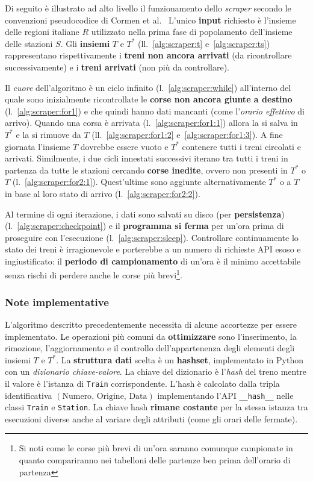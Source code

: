 \documentclass[12pt,italian]{report}
\begin{document}
Di seguito è illustrato ad alto livello il funzionamento dello
\textit{scraper} secondo le convenzioni pseudocodice di Cormen et
al.\@~\cite{Cormen} L'unico \textbf{input} richiesto è l'insieme delle
regioni italiane $R$ utilizzato nella prima fase di popolamento
dell'insieme delle stazioni $S$.  Gli \textbf{insiemi} $T$ e $T^*$
(ll.\@~\ref{alg:scraper:t} e~\ref{alg:scraper:ts}) rappresentano
rispettivamente i \textbf{treni non ancora arrivati} (da ricontrollare
successivamente) e i \textbf{treni arrivati} (non più da controllare).

Il \textit{cuore} dell'algoritmo è un ciclo infinito
(l.\@~\ref{alg:scraper:while}) all'interno del quale sono inizialmente
ricontrollate le \textbf{corse non ancora giunte a destino}
(l.\@~\ref{alg:scraper:for1}) e che quindi hanno dati mancanti (come
l'\textit{orario effettivo} di arrivo).  Quando una corsa è arrivata
(l.\@~\ref{alg:scraper:for1:1}) allora la si salva in $T^*$ e la si
rimuove da $T$ (ll.\@~\ref{alg:scraper:for1:2}
e~\ref{alg:scraper:for1:3}).  A fine giornata l'insieme $T$ dovrebbe
essere vuoto e $T^*$ contenere tutti i treni circolati e arrivati.
Similmente, i due cicli innestati successivi iterano tra tutti i treni
in partenza da tutte le stazioni cercando \textbf{corse inedite},
ovvero non presenti in $T^*$ o $T$ (l.\@~\ref{alg:scraper:for2:1}).
Quest'ultime sono aggiunte alternativamente $T^*$ o a $T$ in base al
loro stato di arrivo (l.\@~\ref{alg:scraper:for2:2}).

Al termine di ogni iterazione, i dati sono salvati su disco (per
\textbf{persistenza}) (l.\@~\ref{alg:scraper:checkpoint}) e il
\textbf{programma si ferma} per un'ora prima di proseguire con
l'esecuzione (l.\@~\ref{alg:scraper:sleep}).  Controllare
continuamente lo stato dei treni è irragionevole e porterebbe a un
numero di richieste API esoso e ingiustificato: il \textbf{periodo di
    campionamento} di un'ora è il minimo accettabile senza rischi di
perdere anche le corse più brevi\footnote{Si noti come le corse più
    brevi di un'ora saranno comunque campionate in quanto compariranno
    nei tabelloni delle partenze ben prima dell'orario di partenza}.

\subsubsection{Note implementative}

L'algoritmo descritto precedentemente necessita di alcune accortezze
per essere implementato.  Le operazioni più comuni da
\textbf{ottimizzare} sono l'inserimento, la rimozione, l'aggiornamento
e il controllo dell'appartenenza degli elementi degli insiemi $T$ e
$T^*$.  La \textbf{struttura dati} scelta è un \textbf{hashset},
implementato in Python con un \textit{dizionario chiave-valore}.  La
chiave del dizionario è l'\textit{hash} del treno mentre il valore è
l'istanza di \texttt{Train} corrispondente.  L'hash è calcolato dalla
tripla identificativa
$(\textrm{Numero}, \, \textrm{Origine}, \, \textrm{Data})$
implementando l'API \texttt{\_\_hash\_\_} nelle classi \texttt{Train}
e \texttt{Station}.  La chiave hash \textbf{rimane costante} per la
stessa istanza tra esecuzioni diverse anche al variare degli attributi
(come gli orari delle fermate).
\end{document}
